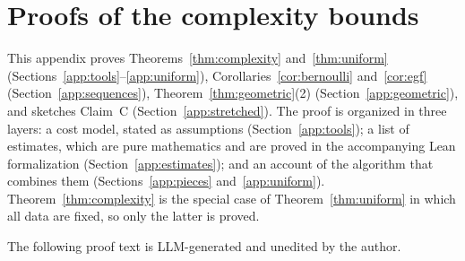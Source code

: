 \section{Proofs of the complexity bounds}\label{app:cost}

This appendix proves Theorems~\ref{thm:complexity} and~\ref{thm:uniform} (Sections~\ref{app:tools}--\ref{app:uniform}),
Corollaries~\ref{cor:bernoulli} and~\ref{cor:egf} (Section~\ref{app:sequences}), Theorem~\ref{thm:geometric}(2)
(Section~\ref{app:geometric}), and sketches Claim~C (Section~\ref{app:stretched}). The proof is organized in three
layers: a cost model, stated as assumptions (Section~\ref{app:tools}); a list of estimates, which are pure mathematics
and are proved in the accompanying Lean formalization (Section~\ref{app:estimates}); and an account of the algorithm
that combines them (Sections~\ref{app:pieces} and~\ref{app:uniform}). Theorem~\ref{thm:complexity} is the special
case of Theorem~\ref{thm:uniform} in which all data are fixed, so only the latter is proved.

The following proof text is LLM-generated and unedited by the author.

